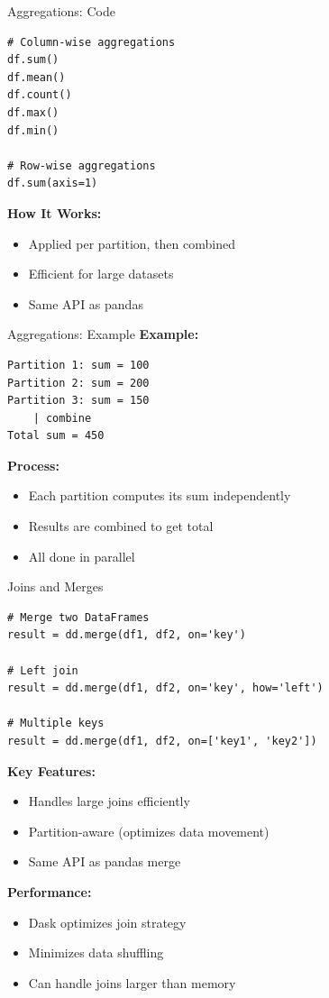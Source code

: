 \documentclass[aspectratio=169]{beamer}
\begin{document}
\begin{frame}[fragile]{Aggregations: Code}
\small
\begin{lstlisting}
# Column-wise aggregations
df.sum()
df.mean()
df.count()
df.max()
df.min()

# Row-wise aggregations
df.sum(axis=1)
\end{lstlisting}

\textbf{How It Works:}
\begin{itemize}
    \item Applied per partition, then combined
    \item Efficient for large datasets
    \item Same API as pandas
\end{itemize}
\end{frame}

\begin{frame}[fragile]{Aggregations: Example}
\small
\textbf{Example:}
\begin{verbatim}
Partition 1: sum = 100
Partition 2: sum = 200
Partition 3: sum = 150
    | combine
Total sum = 450
\end{verbatim}

\vspace{0.2cm}
\textbf{Process:}
\begin{itemize}
    \item Each partition computes its sum independently
    \item Results are combined to get total
    \item All done in parallel
\end{itemize}
\end{frame}

\begin{frame}[fragile]{Joins and Merges}
\small
\begin{lstlisting}
# Merge two DataFrames
result = dd.merge(df1, df2, on='key')

# Left join
result = dd.merge(df1, df2, on='key', how='left')

# Multiple keys
result = dd.merge(df1, df2, on=['key1', 'key2'])
\end{lstlisting}

\textbf{Key Features:}
\begin{itemize}
    \item Handles large joins efficiently
    \item Partition-aware (optimizes data movement)
    \item Same API as pandas merge
\end{itemize}

\vspace{0.15cm}
\textbf{Performance:}
\begin{itemize}
    \item Dask optimizes join strategy
    \item Minimizes data shuffling
    \item Can handle joins larger than memory
\end{itemize}
\end{frame}
\end{document}
